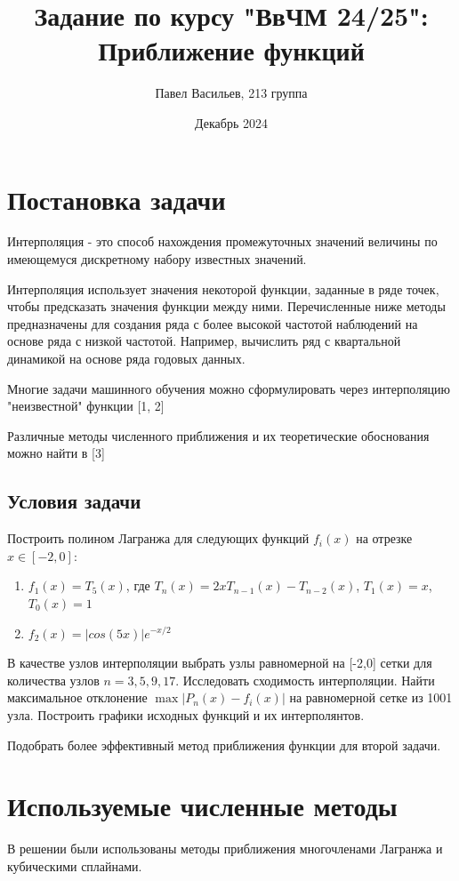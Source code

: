 \documentclass{article}
\title{Задание по курсу "ВвЧМ 24/25": Приближение функций}
\author{Павел Васильев, 213 группа}
\date{Декабрь 2024}
\begin{document}
\maketitle

\section{Постановка задачи}
Интерполяция - это способ нахождения промежуточных значений величины по имеющемуся дискретному набору известных значений.

Интерполяция использует значения некоторой функции, заданные в ряде точек, чтобы предсказать значения функции между ними. Перечисленные ниже методы предназначены для создания ряда с более высокой частотой наблюдений на основе ряда с низкой частотой. Например, вычислить ряд с квартальной динамикой на основе ряда годовых данных.

Многие задачи машинного обучения можно сформулировать через интерполяцию "неизвестной" функции
[1, 2]

Различные методы численного приближения и их теоретические обоснования можно найти в [3]

\subsection{Условия задачи}
Построить полином Лагранжа для следующих функций \(f_i(x)\) на отрезке \(x \in [-2,0]\):
\begin{enumerate}
    \item \(f_1(x) = T_5(x)\), где \(T_n(x) = 2xT_{n-1}(x) - T_{n-2}(x)\), \(T_1(x) = x\), \(T_0(x) = 1\)
    \item \(f_2(x)=|cos(5x)|e^{-x/2}\)
\end{enumerate}
В качестве узлов интерполяции выбрать узлы равномерной на [-2,0] сетки для количества узлов \(n=3,5,9,17\). Исследовать сходимость интерполяции. Найти максимальное отклонение \(\max|P_n(x)-f_i(x)|\) на равномерной сетке из 1001 узла. Построить графики исходных функций и их интерполянтов.

Подобрать более эффективный метод приближения функции для второй задачи.


\section{Используемые численные методы}
В решении были использованы методы приближения многочленами Лагранжа и кубическими сплайнами.
\end{document}

